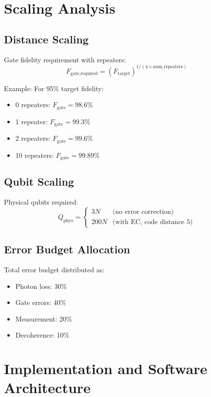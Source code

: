\documentclass[11pt,a4paper]{article}
\begin{document}
\section{Scaling Analysis}

\subsection{Distance Scaling}

Gate fidelity requirement with repeaters:
$$F_{\text{gate,required}} = (F_{\text{target}})^{1/(4 \times \text{num\_repeaters})}$$

Example: For 95\% target fidelity:
\begin{itemize}
    \item 0 repeaters: $F_{\text{gate}} = 98.6\%$
    \item 1 repeater: $F_{\text{gate}} = 99.3\%$
    \item 2 repeaters: $F_{\text{gate}} = 99.6\%$
    \item 10 repeaters: $F_{\text{gate}} = 99.89\%$
\end{itemize}

\subsection{Qubit Scaling}

Physical qubits required:
$$Q_{\text{phys}} = \begin{cases}
3N & \text{(no error correction)} \\
200N & \text{(with EC, code distance 5)}
\end{cases}$$

\subsection{Error Budget Allocation}

Total error budget distributed as:
\begin{itemize}
    \item Photon loss: 30\%
    \item Gate errors: 40\%
    \item Measurement: 20\%
    \item Decoherence: 10\%
\end{itemize}

\section{Implementation and Software Architecture}
\end{document}

